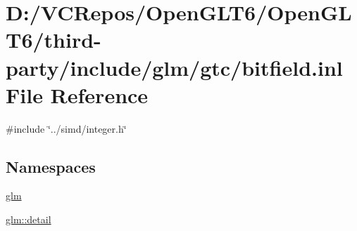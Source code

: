 \hypertarget{bitfield_8inl}{}\section{D\+:/\+V\+C\+Repos/\+Open\+G\+L\+T6/\+Open\+G\+L\+T6/third-\/party/include/glm/gtc/bitfield.inl File Reference}
\label{bitfield_8inl}
{\ttfamily \#include \char`\"{}../simd/integer.\+h\char`\"{}}\newline
\subsection*{Namespaces}
\begin{DoxyCompactItemize}
\item 
 \mbox{\hyperlink{namespaceglm}{glm}}
\item 
 \mbox{\hyperlink{namespaceglm_1_1detail}{glm\+::detail}}
\end{DoxyCompactItemize}
